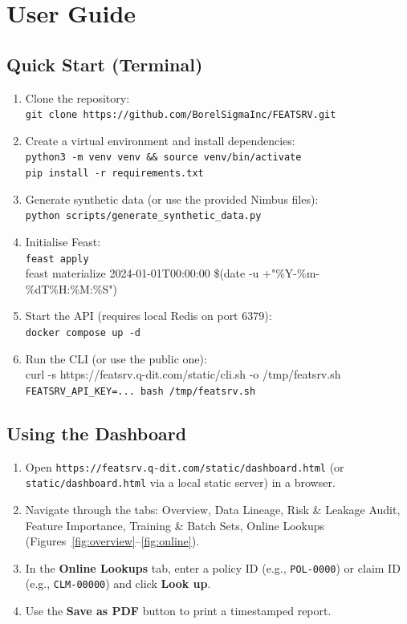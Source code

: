 \documentclass[11pt,a4paper]{article}
\begin{document}
\section{User Guide}

\subsection{Quick Start (Terminal)}
\begin{enumerate}[leftmargin=1.6em]
\item Clone the repository:\\
\texttt{git clone https://github.com/BorelSigmaInc/FEATSRV.git}
\item Create a virtual environment and install dependencies:\\
\texttt{python3 -m venv venv \&\& source venv/bin/activate}\\
\texttt{pip install -r requirements.txt}
\item Generate synthetic data (or use the provided Nimbus files):\\
\texttt{python scripts/generate\_synthetic\_data.py}
\item Initialise Feast:\\
\texttt{feast apply}\\
{\footnotesize\ttfamily feast materialize 2024-01-01T00:00:00 \$(date -u +"\%Y-\%m-\%dT\%H:\%M:\%S")}
\item Start the API (requires local Redis on port 6379):\\
\texttt{docker compose up -d}
\item Run the CLI (or use the public one):\\
{\footnotesize\ttfamily curl -s https://featsrv.q-dit.com/static/cli.sh -o /tmp/featsrv.sh}\\
\texttt{FEATSRV\_API\_KEY=... bash /tmp/featsrv.sh}
\end{enumerate}

\subsection{Using the Dashboard}
\begin{enumerate}[leftmargin=1.6em]
\item Open \texttt{https://featsrv.q-dit.com/static/dashboard.html} (or \texttt{static/dashboard.html} via a local static server) in a browser.
\item Navigate through the tabs: Overview, Data Lineage, Risk \& Leakage Audit, Feature Importance, Training \& Batch Sets, Online Lookups (Figures~\ref{fig:overview}--\ref{fig:online}).
\item In the \textbf{Online Lookups} tab, enter a policy ID (e.g., \texttt{POL-0000}) or claim ID (e.g., \texttt{CLM-00000}) and click \textbf{Look up}.
\item Use the \textbf{Save as PDF} button to print a timestamped report.
\end{enumerate}
\end{document}
